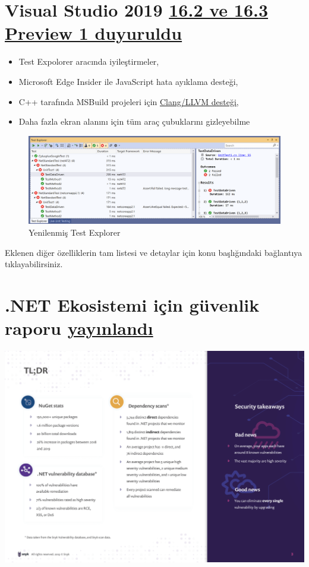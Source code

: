 \documentclass[11pt]{article}
\begin{document}
\section{Visual Studio 2019 \href{https://devblogs.microsoft.com/visualstudio/visual-studio-2019-version-16-2-generally-available-and-16-3-preview-1/}{16.2 ve 16.3 Preview 1 duyuruldu}}
\label{sec:org6cb153e}
\begin{itemize}
\item Test Expolorer aracında iyileştirmeler,
\item Microsoft Edge Insider ile JavaScript hata ayıklama desteği,
\item C++ tarafında MSBuild projeleri için \href{https://devblogs.microsoft.com/cppblog/clang-llvm-support-for-msbuild-projects/}{Clang/LLVM desteği},
\item Daha fazla ekran alanını için tüm araç çubuklarını gizleyebilme
\end{itemize}

\begin{figure}[htbp]
\centering
\includegraphics[width=.9\linewidth]{gorseller/visualstudio-yeni-test-explorer.png}
\caption{Yenilenmiş Test Explorer}
\end{figure}

Eklenen diğer özelliklerin tam listesi ve detaylar için konu başlığındaki
bağlantıya tıklayabilirsiniz.
\section{.NET Ekosistemi için güvenlik raporu \href{https://snyk.io/blog/net-open-source-security-insights/}{yayınlandı}}
\label{sec:org9955f52}
\begin{center}
\includegraphics[width=.9\linewidth]{gorseller/dotnet-guvenlik-raporu-tldr.png}
\end{center}
\end{document}
